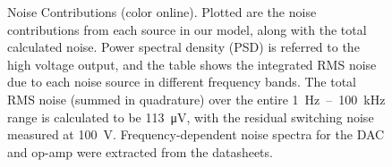 \documentclass[aip,rsi,reprint]{revtex4-1} %
\begin{document}
\begin{figure}[t]

\caption{Noise Contributions (color online). Plotted are the noise contributions from each source in our model, along with the total calculated noise. Power spectral density (PSD) is referred to the high voltage output, and the table shows the integrated RMS noise due to each noise source in different frequency bands. The total RMS noise (summed in quadrature) over the entire \SI{1}{\hertz}~--~\SI{100}{\kilo\hertz} range is calculated to be \SI{113}{\micro\volt}, with the residual switching noise measured at \SI{100}{\volt}. Frequency-dependent noise spectra for the DAC and op-amp were extracted from the datasheets. \label{Fig:NoisePlot}}
\end{figure} 
\end{document}
